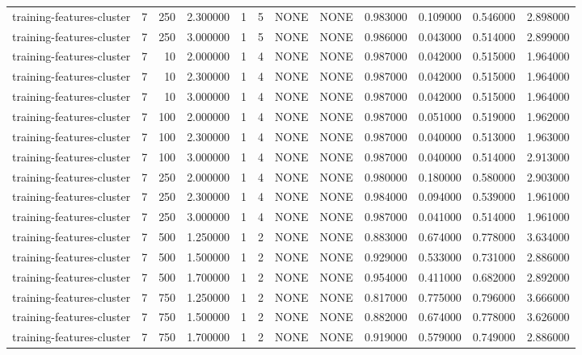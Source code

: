 \begin{tabular}{lrrrllllrrrr}
training-features-cluster & 7 & 250 & 2.300000 & 1 & 5 & NONE & NONE & 0.983000 & 0.109000 & 0.546000 & 2.898000 \\
training-features-cluster & 7 & 250 & 3.000000 & 1 & 5 & NONE & NONE & 0.986000 & 0.043000 & 0.514000 & 2.899000 \\
training-features-cluster & 7 & 10 & 2.000000 & 1 & 4 & NONE & NONE & 0.987000 & 0.042000 & 0.515000 & 1.964000 \\
training-features-cluster & 7 & 10 & 2.300000 & 1 & 4 & NONE & NONE & 0.987000 & 0.042000 & 0.515000 & 1.964000 \\
training-features-cluster & 7 & 10 & 3.000000 & 1 & 4 & NONE & NONE & 0.987000 & 0.042000 & 0.515000 & 1.964000 \\
training-features-cluster & 7 & 100 & 2.000000 & 1 & 4 & NONE & NONE & 0.987000 & 0.051000 & 0.519000 & 1.962000 \\
training-features-cluster & 7 & 100 & 2.300000 & 1 & 4 & NONE & NONE & 0.987000 & 0.040000 & 0.513000 & 1.963000 \\
training-features-cluster & 7 & 100 & 3.000000 & 1 & 4 & NONE & NONE & 0.987000 & 0.040000 & 0.514000 & 2.913000 \\
training-features-cluster & 7 & 250 & 2.000000 & 1 & 4 & NONE & NONE & 0.980000 & 0.180000 & 0.580000 & 2.903000 \\
training-features-cluster & 7 & 250 & 2.300000 & 1 & 4 & NONE & NONE & 0.984000 & 0.094000 & 0.539000 & 1.961000 \\
training-features-cluster & 7 & 250 & 3.000000 & 1 & 4 & NONE & NONE & 0.987000 & 0.041000 & 0.514000 & 1.961000 \\
training-features-cluster & 7 & 500 & 1.250000 & 1 & 2 & NONE & NONE & 0.883000 & 0.674000 & 0.778000 & 3.634000 \\
training-features-cluster & 7 & 500 & 1.500000 & 1 & 2 & NONE & NONE & 0.929000 & 0.533000 & 0.731000 & 2.886000 \\
training-features-cluster & 7 & 500 & 1.700000 & 1 & 2 & NONE & NONE & 0.954000 & 0.411000 & 0.682000 & 2.892000 \\
training-features-cluster & 7 & 750 & 1.250000 & 1 & 2 & NONE & NONE & 0.817000 & 0.775000 & 0.796000 & 3.666000 \\
training-features-cluster & 7 & 750 & 1.500000 & 1 & 2 & NONE & NONE & 0.882000 & 0.674000 & 0.778000 & 3.626000 \\
training-features-cluster & 7 & 750 & 1.700000 & 1 & 2 & NONE & NONE & 0.919000 & 0.579000 & 0.749000 & 2.886000 \\

\end{tabular}
